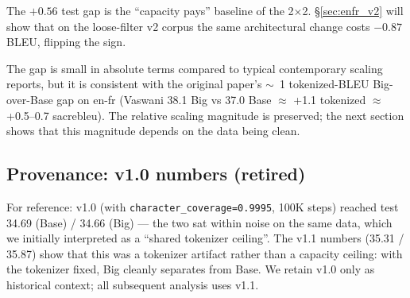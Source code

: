 The $+0.56$ test gap is the ``capacity pays'' baseline of the 2$\times$2. \S\ref{sec:enfr_v2} will show that on the loose-filter v2 corpus the same architectural change costs $-0.87$ BLEU, flipping the sign.

The gap is small in absolute terms compared to typical contemporary scaling reports, but it is consistent with the original paper's $\sim$~1 tokenized-BLEU Big-over-Base gap on en-fr (Vaswani 38.1 Big vs 37.0 Base $\approx$ +1.1 tokenized $\approx$ +0.5--0.7 sacrebleu). The relative scaling magnitude is preserved; the next section shows that this magnitude depends on the data being clean.

\subsection{Provenance: v1.0 numbers (retired)}
For reference: v1.0 (with \texttt{character\_coverage=0.9995}, 100K steps) reached test 34.69 (Base) / 34.66 (Big) --- the two sat within noise on the same data, which we initially interpreted as a ``shared tokenizer ceiling''. The v1.1 numbers (35.31 / 35.87) show that this was a tokenizer artifact rather than a capacity ceiling: with the tokenizer fixed, Big cleanly separates from Base. We retain v1.0 only as historical context; all subsequent analysis uses v1.1.
